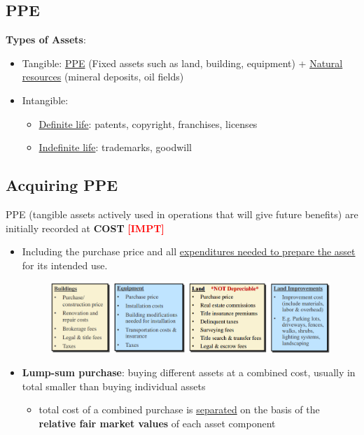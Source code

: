 \documentclass{article}
\newcommand{\impt}[0]{\textcolor{red}{\textbf{[IMPT] }}}
\begin{document}
\begin{multicols}{2}
\section{PPE}
\textbf{Types of Assets}:
\begin{itemize}
	\item Tangible: \underline{PPE} (Fixed assets such as land, building, equipment) + \underline{Natural resources} (mineral deposits, oil fields)
	\item Intangible:
	\begin{itemize}
		\item \underline{Definite life}: patents, copyright, franchises, licenses
		\item \underline{Indefinite life}: trademarks, goodwill
	\end{itemize}
\end{itemize}
\subsection{Acquiring PPE}
PPE (tangible assets actively used in operations that will give future benefits) are initially recorded at \textbf{COST} \impt
\begin{itemize}
	\item Including the purchase price and all \underline{expenditures needed to prepare the asset} for its intended use.
	\begin{figure}[H]
		\centering
		\includegraphics[width=\columnwidth]{image/ppe_acquisition}
	\end{figure}
    \item \textbf{Lump-sum purchase}: buying different assets at a combined cost, usually in total smaller than buying individual assets
    \begin{itemize}
    	\item total cost of a combined purchase is \underline{separated} on the basis of the \textbf{relative fair market values} of each asset component
    \end{itemize}
\end{itemize}

\end{multicols}
\end{document}
